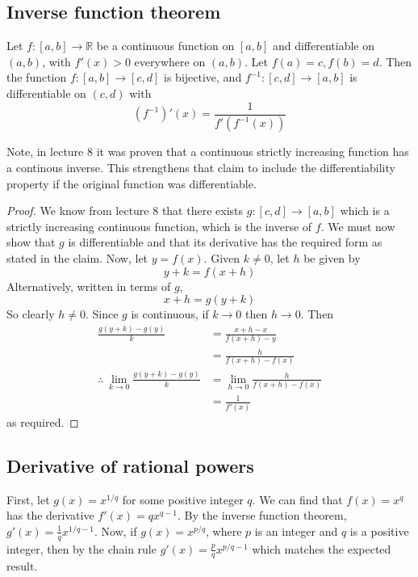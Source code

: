 \subsection{Inverse function theorem}
\begin{theorem}
	Let \(f \colon [a, b] \to \mathbb R\) be a continuous function on \([a, b]\) and differentiable on \((a, b)\), with \(f'(x) > 0\) everywhere on \((a, b)\).
	Let \(f(a) = c, f(b) = d\).
	Then the function \(f \colon [a,b] \to [c,d]\) is bijective, and \(f^{-1} \colon [c,d] \to [a,b]\) is differentiable on \((c, d)\) with
	\[
		\left( f^{-1} \right)' (x) = \frac{1}{f'\left(f^{-1}(x)\right)}
	\]
\end{theorem}
Note, in lecture 8 it was proven that a continuous strictly increasing function has a continous inverse.
This strengthens that claim to include the differentiability property if the original function was differentiable.
\begin{proof}
	We know from lecture 8 that there exists \(g \colon [c,d] \to [a,b]\) which is a strictly increasing continuous function, which is the inverse of \(f\).
	We must now show that \(g\) is differentiable and that its derivative has the required form as stated in the claim.
	Now, let \(y = f(x)\).
	Given \(k \neq 0\), let \(h\) be given by
	\[
		y + k = f(x+h)
	\]
	Alternatively, written in terms of \(g\),
	\[
		x + h = g(y + k)
	\]
	So clearly \(h \neq 0\).
	Since \(g\) is continuous, if \(k \to 0\) then \(h \to 0\).
	Then
	\begin{align*}
		\frac{g(y + k) - g(y)}{k}                           & = \frac{x + h - x}{f(x+h) - y}           \\
		                                                    & = \frac{h}{f(x+h) - f(x)}                \\
		\therefore\ \lim_{k \to 0} \frac{g(y + k) - g(y)}{k} & = \lim_{h \to 0} \frac{h}{f(x+h) - f(x)} \\
		                                                    & = \frac{1}{f'(x)}
	\end{align*}
	as required.
\end{proof}

\subsection{Derivative of rational powers}
First, let \(g(x) = x^{1/q}\) for some positive integer \(q\).
We can find that \(f(x) = x^q\) has the derivative \(f'(x) = qx^{q-1}\).
By the inverse function theorem, \(g'(x) = \frac{1}{q}x^{1/q - 1}\).
Now, if \(g(x) = x^{p/q}\), where \(p\) is an integer and \(q\) is a positive integer, then by the chain rule \(g'(x) = \frac{p}{q}x^{p/q - 1}\) which matches the expected result.

